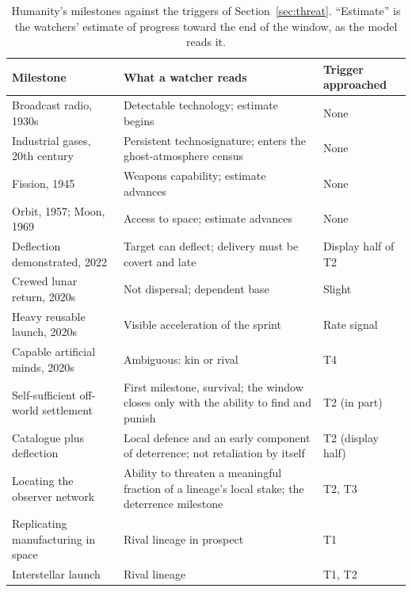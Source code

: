 \documentclass[preprint,12pt]{elsarticle}
\theoremstyle{definition}
\begin{document}
\begin{table}[!htbp]
\centering
\caption{Humanity's milestones against the triggers of Section~\ref{sec:threat}. ``Estimate'' is the watchers' estimate of progress toward the end of the window, as the model reads it.}
\label{tab:milestones}
\small
\begin{tabularx}{\textwidth}{@{}lXl@{}}
\toprule
Milestone & What a watcher reads & Trigger approached \\
\midrule
Broadcast radio, 1930s & Detectable technology; estimate begins & None \\
Industrial gases, 20th century & Persistent technosignature; enters the ghost-atmosphere census & None \\
Fission, 1945 & Weapons capability; estimate advances & None \\
Orbit, 1957; Moon, 1969 & Access to space; estimate advances & None \\
Deflection demonstrated, 2022 & Target can deflect; delivery must be covert and late & Display half of T2 \\
Crewed lunar return, 2020s & Not dispersal; dependent base & Slight \\
Heavy reusable launch, 2020s & Visible acceleration of the sprint & Rate signal \\
Capable artificial minds, 2020s & Ambiguous: kin or rival & T4 \\
Self-sufficient off-world settlement & First milestone, survival; the window closes only with the ability to find and punish & T2 (in part) \\
Catalogue plus deflection & Local defence and an early component of deterrence; not retaliation by itself & T2 (display half) \\
Locating the observer network & Ability to threaten a meaningful fraction of a lineage's local stake; the deterrence milestone & T2, T3 \\
Replicating manufacturing in space & Rival lineage in prospect & T1 \\
Interstellar launch & Rival lineage & T1, T2 \\
\bottomrule
\end{tabularx}
\end{table}
\end{document}
